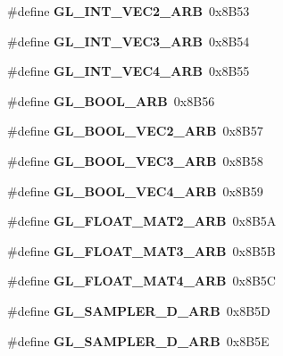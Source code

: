 \begin{DoxyCompactItemize}
\item 
\#define {\bfseries G\+L\+\_\+\+I\+N\+T\+\_\+\+V\+E\+C2\+\_\+\+A\+R\+B}~0x8\+B53\label{_s_d_l__opengl_8h_ab1461d6824f7963ac496446ab3483804}

\item 
\#define {\bfseries G\+L\+\_\+\+I\+N\+T\+\_\+\+V\+E\+C3\+\_\+\+A\+R\+B}~0x8\+B54\label{_s_d_l__opengl_8h_aba0b5b54e90ac26b72c6efa66b9377ad}

\item 
\#define {\bfseries G\+L\+\_\+\+I\+N\+T\+\_\+\+V\+E\+C4\+\_\+\+A\+R\+B}~0x8\+B55\label{_s_d_l__opengl_8h_a2b5ce762a7a459d77e2f0c786f8f1be0}

\item 
\#define {\bfseries G\+L\+\_\+\+B\+O\+O\+L\+\_\+\+A\+R\+B}~0x8\+B56\label{_s_d_l__opengl_8h_af0a7952d4e24a09bd9f46efc7154fb5c}

\item 
\#define {\bfseries G\+L\+\_\+\+B\+O\+O\+L\+\_\+\+V\+E\+C2\+\_\+\+A\+R\+B}~0x8\+B57\label{_s_d_l__opengl_8h_a8a9feb95e641ca51e933c27f55a1ced0}

\item 
\#define {\bfseries G\+L\+\_\+\+B\+O\+O\+L\+\_\+\+V\+E\+C3\+\_\+\+A\+R\+B}~0x8\+B58\label{_s_d_l__opengl_8h_aa6376db3e82e02d4b226c40c68535386}

\item 
\#define {\bfseries G\+L\+\_\+\+B\+O\+O\+L\+\_\+\+V\+E\+C4\+\_\+\+A\+R\+B}~0x8\+B59\label{_s_d_l__opengl_8h_ae85aeb57ebdf4ba4fa37ea0ea054e773}

\item 
\#define {\bfseries G\+L\+\_\+\+F\+L\+O\+A\+T\+\_\+\+M\+A\+T2\+\_\+\+A\+R\+B}~0x8\+B5\+A\label{_s_d_l__opengl_8h_a954efac55233f54d97a3c9f347d1bf03}

\item 
\#define {\bfseries G\+L\+\_\+\+F\+L\+O\+A\+T\+\_\+\+M\+A\+T3\+\_\+\+A\+R\+B}~0x8\+B5\+B\label{_s_d_l__opengl_8h_ab62d536f4a1c8baa740c7b0af2e50245}

\item 
\#define {\bfseries G\+L\+\_\+\+F\+L\+O\+A\+T\+\_\+\+M\+A\+T4\+\_\+\+A\+R\+B}~0x8\+B5\+C\label{_s_d_l__opengl_8h_a24145ee3e559eb4a0a41a3095bf23489}

\item 
\#define {\bfseries G\+L\+\_\+\+S\+A\+M\+P\+L\+E\+R\+\_\+D\+\_\+\+A\+R\+B}~0x8\+B5\+D\label{_s_d_l__opengl_8h_a41764a347e1ce667c3ccadef1c913e47}

\item 
\#define {\bfseries G\+L\+\_\+\+S\+A\+M\+P\+L\+E\+R\+\_\+D\+\_\+\+A\+R\+B}~0x8\+B5\+E\label{_s_d_l__opengl_8h_aa5e4f1857e102966af72357f26f23e69}


\end{DoxyCompactItemize}
